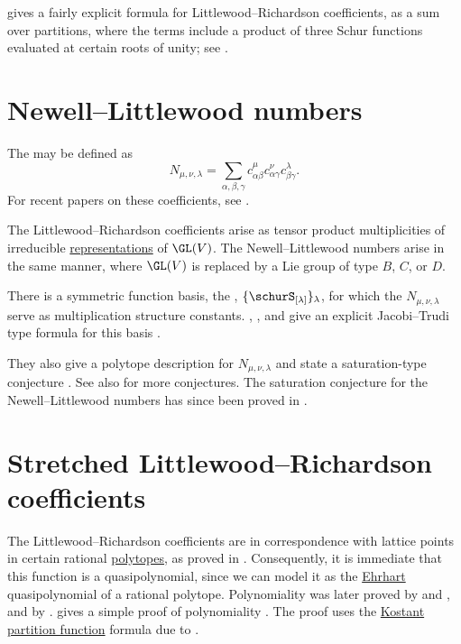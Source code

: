  gives a fairly explicit formula
for Littlewood--Richardson coefficients, as a sum over partitions,
where the terms include a product of three Schur functions evaluated at
certain roots of unity; see \cite{Wen2021x}.



\section[newellLittlewood]{Newell--Littlewood numbers}

The \label{newellLittlewoodNumbersDefinition}
may be defined as
\[
 N_{\mu,\nu,\lambda}
 =
 \sum_{\alpha,\beta,\gamma}
 c^{\mu}_{\alpha\beta} c^{\nu}_{\alpha\gamma}
 c^{\lambda}_{\beta\gamma}.
\]
For recent papers on these coefficients, see \cite{GaoOrelowitzYong2020x,GaoOrelowitzYong2020IIx}.

The Littlewood--Richardson coefficients arise as tensor product
multiplicities of irreducible \hyperref[representationTheory]{representations}
of $\GL(V)$.
The Newell--Littlewood numbers arise in the same manner, where $\GL(V)$ is
replaced by a Lie group of type $B$, $C$, or $D$.

There is a symmetric function basis, the
\label{koikeTeradaBasis},
$\{\schurS_{[\lambda]}\}_\lambda$,
for which the $N_{\mu,\nu,\lambda}$ serve as multiplication structure constants.
, , and  give
an explicit Jacobi--Trudi type formula for this basis
\cite{GaoOrelowitzYong2020x}.

They also give a polytope description for $N_{\mu,\nu,\lambda}$ and state a
saturation-type conjecture \cite[Thm.~5.1]{GaoOrelowitzYong2020x}.  See also
\cite{King2021x} for more conjectures.  The saturation conjecture for the
Newell--Littlewood numbers has since been proved in \cite{Min2024x}.

\section[lrStretched]{Stretched Littlewood--Richardson coefficients}

The Littlewood--Richardson coefficients are in correspondence with lattice
points in certain rational \hyperref[polytope]{polytopes}, as proved in
\cite{BerensteinZelevinsky1988}.
Consequently, it is immediate that this function is a quasipolynomial, since
we can model it as the \hyperref[ehrhartPolynomialDefinition]{Ehrhart}
quasipolynomial of a rational polytope.
Polynomiality was later proved by  and
 \cite{DerksenWeyman2002}, and by
 \cite{Rassart2004}.
 gives a simple proof of polynomiality
\cite{Thawinrak2022x}.
The proof uses the \hyperref[kostantPartitionFunction]{Kostant partition function}
formula due to .




